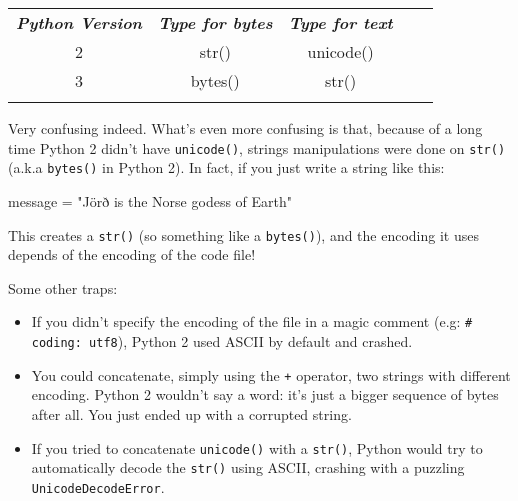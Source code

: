 \begin{table}[h]
\begin{tabular}{cccll}
\cline{1-3}
\multicolumn{1}{|c|}{\textit{\textbf{Python Version}}} & \multicolumn{1}{c|}{\textit{\textbf{Type for bytes}}} & \multicolumn{1}{c|}{\textit{\textbf{Type for text}}} &  &  \\ \cline{1-3}
\multicolumn{1}{|c|}{2}                                & \multicolumn{1}{c|}{str()}                            & \multicolumn{1}{c|}{unicode()}                       &  &  \\ \cline{1-3}
\multicolumn{1}{|c|}{3}                                & \multicolumn{1}{c|}{bytes()}                          & \multicolumn{1}{c|}{str()}                           &  &  \\ \cline{1-3}
\multicolumn{1}{l}{}                                   & \multicolumn{1}{l}{}                                  & \multicolumn{1}{l}{}                                 &  &
\end{tabular}
\end{table}

Very confusing indeed. What's even more confusing is that, because of a long time Python 2 didn't have \lstinline{unicode()}, strings manipulations were done on \lstinline{str()} (a.k.a \lstinline{bytes()} in Python 2). In fact, if you just write a string like this:

\begin{py2}
message = "Jörð is the Norse godess of Earth"
\end{py2}

This creates a \lstinline{str()} (so something like a \lstinline{bytes()}), and the encoding it uses depends of the encoding of the code file!

Some other traps:

\begin{itemize}
    \item If you didn't specify the encoding of the file in a magic comment (e.g: \lstinline{# coding: utf8}), Python 2 used ASCII by default and crashed.
    \item You could concatenate, simply using the \lstinline{+} operator, two strings with different encoding. Python 2 wouldn't say a word: it's just a bigger sequence of bytes after all. You just ended up with a corrupted string.
    \item If you tried to concatenate \lstinline{unicode()} with a \lstinline{str()}, Python would try to automatically decode the \lstinline{str()} using ASCII, crashing with a puzzling \lstinline{UnicodeDecodeError}.
\end{itemize}

